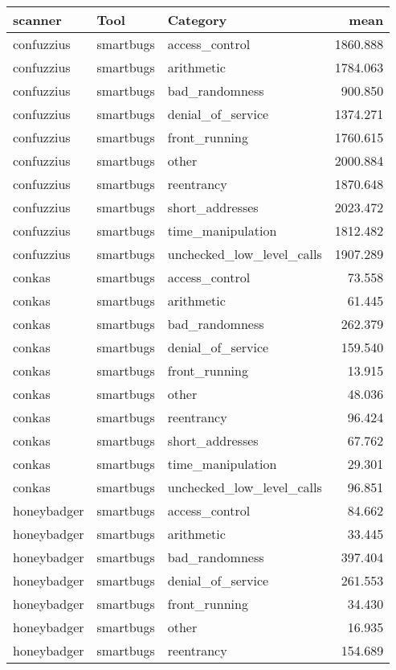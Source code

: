 
\begin{tabular}[t]{lllr}
\toprule
scanner & Tool & Category & mean\\
\midrule
confuzzius & smartbugs & access\_control & 1860.888\\
confuzzius & smartbugs & arithmetic & 1784.063\\
confuzzius & smartbugs & bad\_randomness & 900.850\\
confuzzius & smartbugs & denial\_of\_service & 1374.271\\
confuzzius & smartbugs & front\_running & 1760.615\\
\addlinespace
confuzzius & smartbugs & other & 2000.884\\
confuzzius & smartbugs & reentrancy & 1870.648\\
confuzzius & smartbugs & short\_addresses & 2023.472\\
confuzzius & smartbugs & time\_manipulation & 1812.482\\
confuzzius & smartbugs & unchecked\_low\_level\_calls & 1907.289\\
\addlinespace
conkas & smartbugs & access\_control & 73.558\\
conkas & smartbugs & arithmetic & 61.445\\
conkas & smartbugs & bad\_randomness & 262.379\\
conkas & smartbugs & denial\_of\_service & 159.540\\
conkas & smartbugs & front\_running & 13.915\\
\addlinespace
conkas & smartbugs & other & 48.036\\
conkas & smartbugs & reentrancy & 96.424\\
conkas & smartbugs & short\_addresses & 67.762\\
conkas & smartbugs & time\_manipulation & 29.301\\
conkas & smartbugs & unchecked\_low\_level\_calls & 96.851\\
\addlinespace
honeybadger & smartbugs & access\_control & 84.662\\
honeybadger & smartbugs & arithmetic & 33.445\\
honeybadger & smartbugs & bad\_randomness & 397.404\\
honeybadger & smartbugs & denial\_of\_service & 261.553\\
honeybadger & smartbugs & front\_running & 34.430\\
\addlinespace
honeybadger & smartbugs & other & 16.935\\
honeybadger & smartbugs & reentrancy & 154.689\\

\end{tabular}
